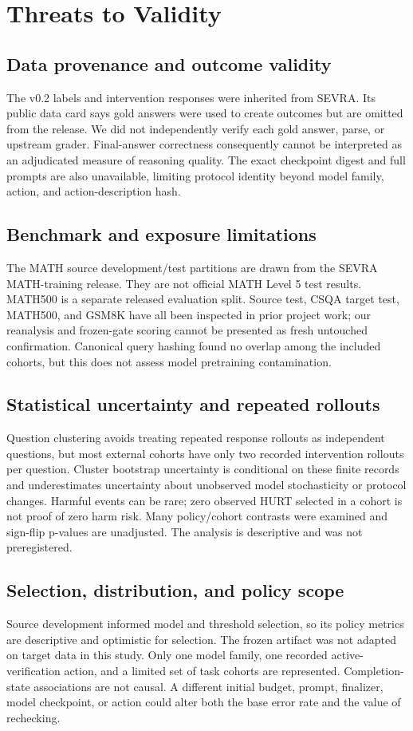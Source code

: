 \documentclass[conference]{IEEEtran}
\begin{document}
\section{Threats to Validity}
\subsection{Data provenance and outcome validity}
The v0.2 labels and intervention responses were inherited from SEVRA. Its public data card says gold answers were used to create outcomes but are omitted from the release. We did not independently verify each gold answer, parse, or upstream grader. Final-answer correctness consequently cannot be interpreted as an adjudicated measure of reasoning quality. The exact checkpoint digest and full prompts are also unavailable, limiting protocol identity beyond model family, action, and action-description hash.

\subsection{Benchmark and exposure limitations}
The MATH source development/test partitions are drawn from the SEVRA MATH-training release. They are not official MATH Level 5 test results. MATH500 is a separate released evaluation split. Source test, CSQA target test, MATH500, and GSM8K have all been inspected in prior project work; our reanalysis and frozen-gate scoring cannot be presented as fresh untouched confirmation. Canonical query hashing found no overlap among the included cohorts, but this does not assess model pretraining contamination.

\subsection{Statistical uncertainty and repeated rollouts}
Question clustering avoids treating repeated response rollouts as independent questions, but most external cohorts have only two recorded intervention rollouts per question. Cluster bootstrap uncertainty is conditional on these finite records and underestimates uncertainty about unobserved model stochasticity or protocol changes. Harmful events can be rare; zero observed HURT selected in a cohort is not proof of zero harm risk. Many policy/cohort contrasts were examined and sign-flip p-values are unadjusted. The analysis is descriptive and was not preregistered.

\subsection{Selection, distribution, and policy scope}
Source development informed model and threshold selection, so its policy metrics are descriptive and optimistic for selection. The frozen artifact was not adapted on target data in this study. Only one model family, one recorded active-verification action, and a limited set of task cohorts are represented. Completion-state associations are not causal. A different initial budget, prompt, finalizer, model checkpoint, or action could alter both the base error rate and the value of rechecking.
\end{document}
